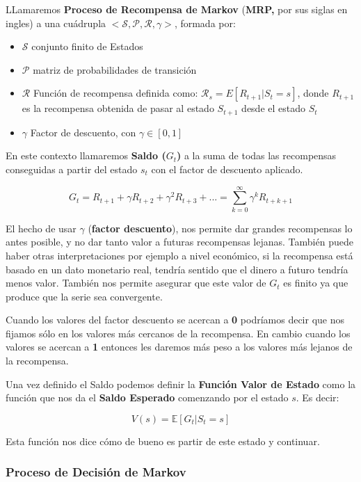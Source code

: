 \documentclass[
  a4paper,
  DIV=11,
  numbers=noendperiod]{scrreprt}
\providecommand{\tightlist}{%
  \setlength{\itemsep}{0pt}\setlength{\parskip}{0pt}}\usepackage{longtable,booktabs,array}
\begin{document}
LLamaremos \textbf{Proceso de Recompensa de Markov} (\textbf{MRP,} por
sus siglas en ingles) a una cuádrupla
\(<\mathcal S,\mathcal P,\mathcal R,\gamma>\), formada por:

\begin{itemize}
\tightlist
\item
  \(\mathcal S\) conjunto finito de Estados
\item
  \(\mathcal P\) matriz de probabilidades de transición
\item
  \(\mathcal R\) Función de recompensa definida como:
  \(\mathcal R_s=E[R_{t+1}|S_t=s]\), donde \(R_{t+1}\)es la recompensa
  obtenida de pasar al estado \(S_{t+1}\) desde el estado \(S_t\)
\item
  \(\gamma\) Factor de descuento, con \(\gamma \in [0,1]\)
\end{itemize}

En este contexto llamaremos \textbf{Saldo (}\(G_t\)\textbf{)} a la suma
de todas las recompensas conseguidas a partir del estado \(s_t\) con el
factor de descuento aplicado.

\[
G_t = R_{t+1} + \gamma R_{t+2} + \gamma^2 R_{t+3} + ... = \sum_{k=0}^\infty\gamma^kR_{t+k+1}
\]

El hecho de usar \(\gamma\) (\textbf{factor descuento}), nos permite dar
grandes recompensas lo antes posible, y no dar tanto valor a futuras
recompensas lejanas. También puede haber otras interpretaciones por
ejemplo a nivel económico, si la recompensa está basado en un dato
monetario real, tendría sentido que el dinero a futuro tendría menos
valor. También nos permite asegurar que este valor de \(G_t\) es finito
ya que produce que la serie sea convergente.

Cuando los valores del factor descuento se acercan a \textbf{0}
podríamos decir que nos fijamos sólo en los valores más cercanos de la
recompensa. En cambio cuando los valores se acercan a \textbf{1}
entonces les daremos más peso a los valores más lejanos de la
recompensa.

Una vez definido el Saldo podemos definir la \textbf{Función Valor de
Estado} como la función que nos da el \textbf{Saldo Esperado} comenzando
por el estado \(s\). Es decir:

\[
V(s) = \mathbb E[G_t|S_t=s]
\]

Esta función nos dice cómo de bueno es partir de este estado y
continuar.

\subsubsection{Proceso de Decisión de
Markov}\label{proceso-de-decisiuxf3n-de-markov}
\end{document}
